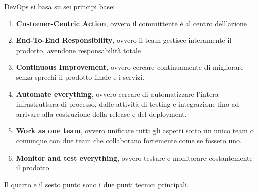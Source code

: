 DevOps si basa su sei principi base:
\begin{enumerate}
      \item \textbf{Customer-Centric Action}, ovvero il committente è al centro
            dell'azione
      \item \textbf{End-To-End Responsibility}, ovvero il team gestisce interamente
            il prodotto, avendone responsabilità totale
      \item \textbf{Continuous Improvement}, ovvero cercare continuamente di
            migliorare senza sprechi il prodotto finale e i servizi.
      \item \textbf{Automate everything}, ovvero cercare di automatizzare l'intera
            infrastruttura di processo, dalle attività di testing e integrazione
            fino ad arrivare alla costruzione della release e del deployment.
      \item \textbf{Work as one team}, ovvero unificare tutti gli aspetti sotto un
            unico team o comunque con due team che collaborano fortemente come se
            fossero uno.
      \item \textbf{Monitor and test everything}, ovvero testare e monitorare
            costantemente il prodotto
\end{enumerate}
Il quarto e il sesto punto sono i due punti tecnici principali.
